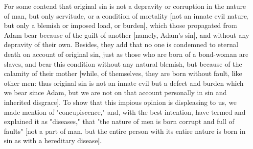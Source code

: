 For some contend that original sin is not a depravity or corruption
in the nature of man, but only servitude, or a condition of mortality
[not an innate evil nature, but only a blemish or imposed load, or
burden], which those propagated from Adam bear because of the guilt
of another [namely, Adam's sin], and without any depravity of their
own.  Besides, they add that no one is condemned to eternal death on
account of original sin, just as those who are born of a bond-woman
are slaves, and bear this condition without any natural blemish, but
because of the calamity of their mother [while, of themselves, they
are born without fault, like other men: thus original sin is not an
innate evil but a defect and burden which we bear since Adam, but we
are not on that account personally in sin and inherited disgrace].
To show that this impious opinion is displeasing to us, we made
mention of "concupiscence," and, with the best intention, have termed
and explained it as "diseases," that "the nature of men is born
corrupt and full of faults" [not a part of man, but the entire person
with its entire nature is born in sin as with a hereditary disease].

